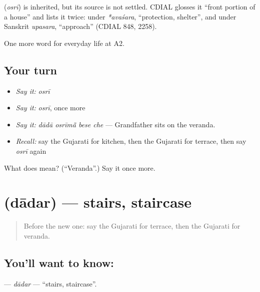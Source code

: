 \begin{cousinweb}
\textbf{} (\emph{osrī}) is inherited, but its source is not settled. CDIAL glosses it \textquotedblleft{}front portion of a house\textquotedblright{} and lists it twice: under \emph{*avaśara}, \textquotedblleft{}protection, shelter\textquotedblright{}, and under Sanskrit \emph{upasara}, \textquotedblleft{}approach\textquotedblright{} (CDIAL 848, 2258).
\end{cousinweb}

\begin{grammarlens}[title={What you've built}]
One more word for everyday life at A2.
\end{grammarlens}

\subsection*{Your turn}
\begin{itemize}
\raggedright
  \item \emph{Say it:} \emph{osrī}
  \item \emph{Say it:} \emph{osrī}, once more
  \item \emph{Say it:} \emph{dādā osrīmā̃ bese che} — Grandfather sits on the veranda.
  \item \emph{Recall:} say the Gujarati for kitchen, then the Gujarati for terrace, then say \emph{osrī} again
\end{itemize}

\begin{tcolorbox}[breakable,colback=teal!4,colframe=teal!35!black,title={Before you move on}]
What does  mean? (\textquotedblleft{}Veranda\textquotedblright{}.) Say it once more.
\end{tcolorbox}
\section[\texorpdfstring{\gu{દાદર} (dādar)}{દાદર (dādar)}]{ (dādar) — stairs, staircase}

\label{lesson:GU-C153-dadar}



\begin{quote}
Before the new one: say the Gujarati for terrace, then the Gujarati for veranda.
\end{quote}

\subsection*{You'll want to know: }
\textbf{} — \emph{dādar} — \textquotedblleft{}stairs, staircase\textquotedblright{}.

